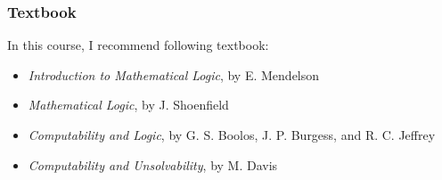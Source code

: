 \begin{frame}
    \frametitle{Textbook}

    In this course, I recommend following textbook:
    \begin{itemize}
        \item \textit{Introduction to Mathematical Logic}, by E. Mendelson
        \item \textit{Mathematical Logic}, by J. Shoenfield
        \item \textit{Computability and Logic}, by G. S. Boolos, J. P. Burgess, and R. C. Jeffrey
        \item \textit{Computability and Unsolvability}, by M. Davis
    \end{itemize}
    
\end{frame}


